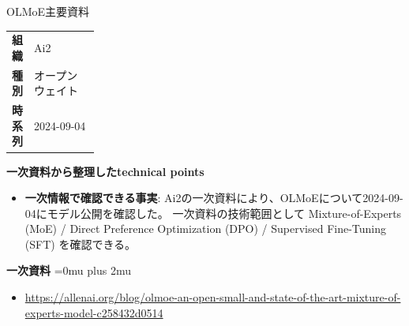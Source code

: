\begin{technicalnote}{OLMoE}{主要資料}
\begingroup
\begin{tabularx}{\linewidth}{@{}>{\bfseries}p{0.22\linewidth}X@{}}
組織 & Ai2 \\
種別 & オープンウェイト \\
時系列 & 2024-09-04 \\
\end{tabularx}
\smallskip
{\bfseries 一次資料から整理したtechnical points}
\begin{itemize}[leftmargin=1.5em,itemsep=0.35em]
\item \textbf{一次情報で確認できる事実}: Ai2の一次資料により、OLMoEについて2024-09-04にモデル公開を確認した。 一次資料の技術範囲として Mixture-of-Experts (MoE) / Direct Preference Optimization (DPO) / Supervised Fine-Tuning (SFT) を確認できる。
\end{itemize}
\begin{minipage}{\linewidth}
\begin{samepage}
{\bfseries 一次資料}
\begingroup\sloppy
\Urlmuskip=0mu plus 2mu\relax
\begin{itemize}[leftmargin=1.5em,itemsep=0.25em]
\item {\scriptsize\url{https://allenai.org/blog/olmoe-an-open-small-and-state-of-the-art-mixture-of-experts-model-c258432d0514}}
\end{itemize}
\endgroup
\end{samepage}
\end{minipage}
\endgroup
\end{technicalnote}
\medskip

